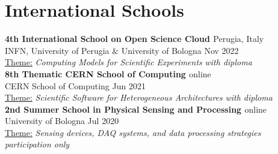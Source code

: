 \newcommand{\event}[2]
  {\normalsize \textbf{\color{hlcolor-0} #1} \hfill {\color{hlcolor-2} #2}}

\newcommand{\organizer}[2]
  {\small \color{hlcolor-1} {#1} \hfill {#2}}

\newcommand{\theme}[1]
  {\normalsize \color{maincolor} \ul{Theme:} \emph{#1}}

\newcommand{\outcome}[1]
  {\normalsize \color{hlcolor-2} \emph{#1}}
  

\section*{International Schools}
\begin{cvcontent}
  \event{4th International School on Open Science Cloud 
    \href{https://agenda.infn.it/event/31408}{\faGlobe}}
    {Perugia, Italy}\\ [0.5mm]
  \organizer{INFN, University of Perugia \& University of Bologna}
    {Nov 2022}\\ [0.5mm]
  \theme{Computing Models for Scientific Experiments}
    \hfill \outcome{with diploma}
   \\ [4mm]
  \event{8th Thematic CERN School of Computing
    \href{https://indico.cern.ch/event/1017080}{\faGlobe}}
    {online}\\ [0.5mm]
  \organizer{CERN School of Computing}{Jun 2021}\\ [0.5mm]
  \theme{Scientific Software for Heterogeneous Architectures}
    \hfill \hfill \outcome{with diploma}
  \\ [4mm]
  \event{2nd Summer School in Physical Sensing and Processing
    \href{https://site.unibo.it/school-physical-sensing-and-processing/en/past-editions/2nd-edition-20-24-july-2020}{\faGlobe}}
    {online}\\ [0.5mm]
  \organizer{University of Bologna}{Jul 2020}\\ [0.5mm]
  \theme{Sensing devices, DAQ systems, and data processing strategies}
    \hfill \hfill \outcome{participation only}
\end{cvcontent}